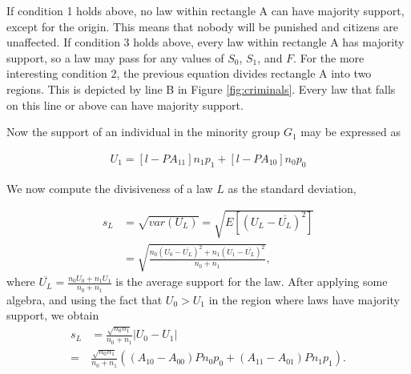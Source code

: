 If condition 1 holds above, no law within rectangle A can have majority support, except for the origin.  This means that nobody will be punished and citizens are unaffected.  If condition 3 holds above, every law within rectangle A has majority support, so a law may pass for any values of $S_0$, $S_1$, and $F$.  For the more interesting condition 2, the previous equation divides rectangle A into two regions.  This is depicted by line B in Figure \ref{fig:criminals}.  Every law that falls on this line or above can have majority support.

Now the support of an individual in the minority group $G_1$ may be expressed as %

\begin{align}
U_1 =  [ l  -  P A_{11} ]n_1 p_1  + [l - P A_{10}] n_0 p_0  
\end{align}


We now compute the divisiveness of a law $L$ as the standard deviation,

\begin{align}
\nonumber s_L &= \sqrt{var(U_L)}  =  \sqrt{E\left[ \left(U_L - \overline{U_L} \right)^2 \right] }  \\
\nonumber &= \sqrt{ \frac{ n_0\left(U_0 - \overline{U_L}\right)^2 + n_1\left(U_1 - \overline{U_L} \right)^2 }{n_0+n_1}  },
\end{align}
where $\overline{U_L} = \frac{n_0 U_0 + n_1U_1 }{n_0 + n_1}$ is the average support for the law.  After applying some algebra, and using the fact that $U_0>U_1$ in the region where laws have majority support, we obtain 
\begin{align}
\nonumber s_L &= \frac{\sqrt{n_0n_1}}{n_0 + n_1} \left| U_0 - U_1 \right|\\
\nonumber = &\frac{\sqrt{n_0n_1}}{n_0 + n_1} \left(  ( A_{10} - A_{00} )P n_0p_0 + ( A_{11} - A_{01})P n_1p_1 \right).
\end{align}

